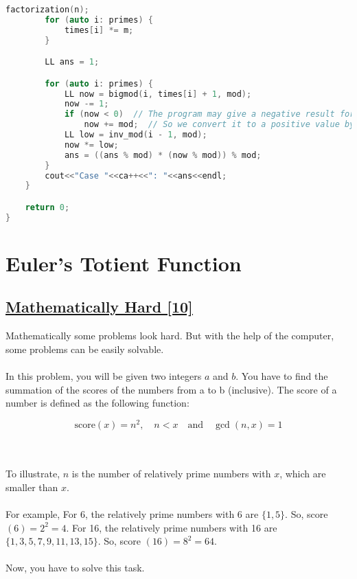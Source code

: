 \documentclass[10pt,a4paper]{article}
\begin{document}
\begin{itemize}
\begin{lstlisting}[language=C++, caption={Efficient Pseudo Code}, label={1st:code}, mathescape=true, breaklines=true]
        factorization(n);
        for (auto i: primes) {
            times[i] *= m;
        }

        LL ans = 1;

        for (auto i: primes) {
            LL now = bigmod(i, times[i] + 1, mod);
            now -= 1;
            if (now < 0)  // The program may give a negative result for modulo of negative numbers
                now += mod;  // So we convert it to a positive value by adding mod
            LL low = inv_mod(i - 1, mod);
            now *= low;
            ans = ((ans % mod) * (now % mod)) % mod;
        }
        cout<<"Case "<<ca++<<": "<<ans<<endl;
    }

    return 0;
}

\end{lstlisting}


\section{Euler’s Totient Function}
\subsection*{\href{https://lightoj.com/problem/mathematically-hard}{\underline{Mathematically Hard [10]}}}
Mathematically some problems look hard. But with the help of the computer, some problems can be easily solvable.
\\ \\
In this problem, you will be given two integers $a$ and $b$. You have to find the summation of the scores of the numbers from a to b (inclusive). The score of a number is defined as the following function:



\[
\text{score}(x) = n^2, \quad n < x \quad \text{and} \quad \gcd(n, x) = 1
\]



\\ \\
To illustrate, $n$ is the number of relatively prime numbers with $x$, which are smaller than $x$.
\\ \\
For example, For 6, the relatively prime numbers with 6 are $\{1, 5\}$. So, score $(6) = 2^2 = 4$. For 16, the relatively prime numbers with 16 are $\{1, 3, 5, 7, 9, 11, 13, 15\}$. So, score $(16) = 8^2 = 64$.
\\ \\
Now, you have to solve this task.


\end{itemize}
\end{document}
